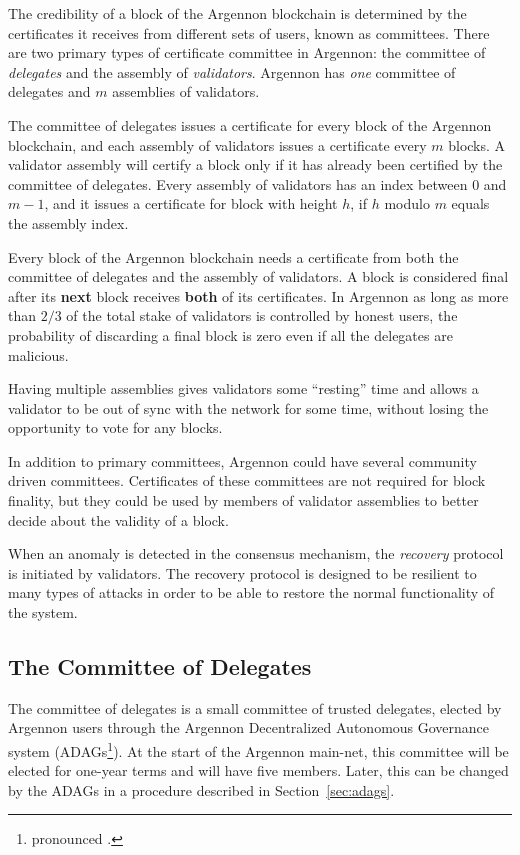 
The credibility of a block of the Argennon blockchain is determined by the certificates it receives
from different sets of users, known as committees. There are two primary types of certificate committee in
Argennon: the committee of \emph{delegates} and the assembly of \emph{validators}. Argennon has \emph{one} committee
of delegates and $m$ assemblies of validators.

The committee of delegates issues a certificate for every block of the Argennon blockchain, and each
assembly of validators issues a certificate every $m$ blocks. A validator assembly will
certify a block only if it has already been certified by the committee of delegates. Every assembly of validators has
an index between $0$ and $m - 1$, and it issues a certificate for block with height $h$, if $h$ modulo $m$ equals
the assembly index.

Every block of the Argennon blockchain needs a certificate from both the committee of delegates and
the assembly of validators. A block is considered final after its \textbf{next} block receives \textbf{both} of
its certificates. In Argennon as long as more than $2/3$ of the total stake of validators is controlled by honest users,
the probability of discarding a final block is zero even if all the delegates are malicious.

Having multiple assemblies gives validators some ``resting'' time and allows a validator to be out of sync with the
network for some time, without losing the opportunity to vote for any blocks.

In addition to primary committees, Argennon could have several community driven committees. Certificates of these
committees are not required for block finality, but they could be used by members of validator assemblies to better
decide about the validity of a block.

When an anomaly is detected in the consensus mechanism, the \emph{recovery} protocol is initiated by validators. The
recovery protocol is designed to be resilient to many types of attacks in order to be able to restore the normal
functionality of the system.

\subsection{The Committee of Delegates}\label{subsec:the-committee-of-delegates}

The committee of delegates is a small committee of trusted delegates, elected by Argennon users through the
Argennon Decentralized Autonomous Governance system (ADAGs\footnote{pronounced .}).
At the start of the Argennon main-net, this committee will be elected for one-year terms and will have five members.
Later, this can be changed by the ADAGs in a procedure described in Section~\ref{sec:adags}.


